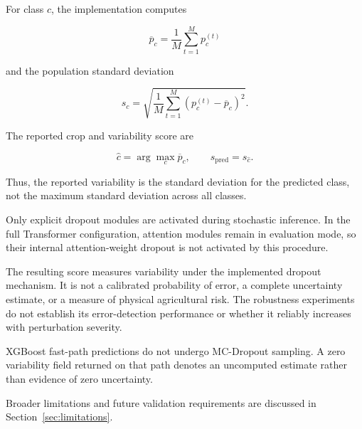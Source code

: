 For class $c$, the implementation computes

\begin{equation}
\overline{p}_c
=
\frac{1}{M}
\sum_{t=1}^{M}p_c^{(t)}
\label{eq:robustness_mc_mean}
\end{equation}

and the population standard deviation

\begin{equation}
s_c
=
\sqrt{
\frac{1}{M}
\sum_{t=1}^{M}
\left(p_c^{(t)}-\overline{p}_c\right)^2
}.
\label{eq:robustness_mc_std}
\end{equation}

The reported crop and variability score are

\begin{equation}
\hat{c}
=
\arg\max_c \overline{p}_c,
\qquad
s_{\mathrm{pred}}=s_{\hat{c}}.
\label{eq:robustness_variability}
\end{equation}

Thus, the reported variability is the standard deviation for
the predicted class, not the maximum standard deviation
across all classes.

Only explicit dropout modules are activated during stochastic
inference. In the full Transformer configuration, attention
modules remain in evaluation mode, so their internal
attention-weight dropout is not activated by this procedure.

The resulting score measures variability under the implemented
dropout mechanism. It is not a calibrated probability of error,
a complete uncertainty estimate, or a measure of physical
agricultural risk. The robustness experiments do not establish
its error-detection performance or whether it reliably increases
with perturbation severity.

XGBoost fast-path predictions do not undergo MC-Dropout sampling.
A zero variability field returned on that path denotes an
uncomputed estimate rather than evidence of zero uncertainty.


Broader limitations and future validation requirements are discussed
in Section~\ref{sec:limitations}.

